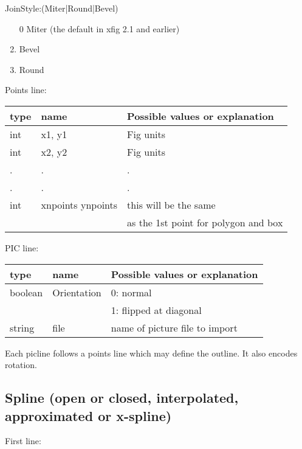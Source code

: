 \documentclass[10pt, a4paper]{article}
\begin{document}
JoinStyle:(Miter|Round|Bevel)

\begin{enumerate}
\item[0] Miter (the default in xfig 2.1 and earlier)
\item    Bevel
\item    Round
\end{enumerate}



Points line:

\begin{tabular}{|lll|}
\hline
type & name & Possible values or explanation \\
\hline
\hline
int & x1, y1            & Fig units \\
int & x2, y2            & Fig units \\
  . &  .    &  .    \\
  . &  .    &  .    \\
int & xnpoints ynpoints & this will be the same \\
    &                   & as the 1st point for polygon and box \\
\hline
\end{tabular}

PIC line:

\begin{tabular}{|lll|}
\hline
type & name & Possible values or explanation \\
\hline
\hline
boolean & Orientation & 0: normal \\
&&                      1: flipped at diagonal\\
string    & file      & name of picture file to import\\
\hline
\end{tabular}

Each picline follows a points line which may define the outline. 
It also encodes rotation. 

\subsection{Spline (open or closed, interpolated, approximated or x-spline)}
\label{subsec:spline}

First line:
\end{document}
